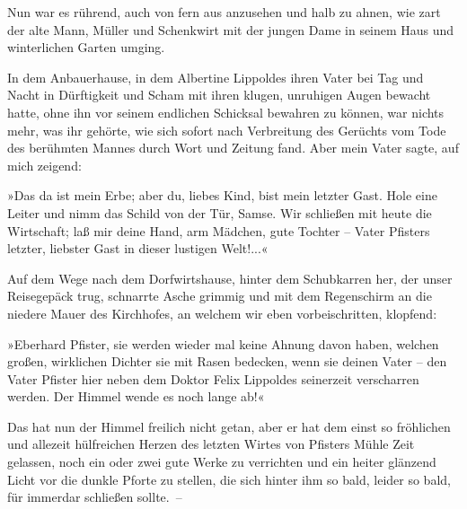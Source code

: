 Nun war es rührend, auch von fern aus anzusehen und halb zu ahnen,
wie zart der alte Mann, Müller und Schenkwirt mit der jungen Dame
in seinem Haus und winterlichen Garten umging.

In dem Anbauerhause, in dem Albertine Lippoldes ihren Vater bei Tag
und Nacht in Dürftigkeit und Scham mit ihren klugen, unruhigen
Augen bewacht hatte, ohne ihn vor seinem endlichen Schicksal
bewahren zu können, war nichts mehr, was ihr gehörte, wie sich
sofort nach Verbreitung des Gerüchts vom Tode des berühmten Mannes
durch Wort und Zeitung fand. Aber mein Vater sagte, auf mich
zeigend:

»Das da ist mein Erbe; aber du, liebes Kind, bist mein letzter
Gast. Hole eine Leiter und nimm das Schild von der Tür, Samse. Wir
schließen mit heute die Wirtschaft; laß mir deine Hand, arm
Mädchen, gute Tochter – Vater Pfisters letzter, liebster Gast in
dieser lustigen Welt!...«

Auf dem Wege nach dem Dorfwirtshause, hinter dem Schubkarren her,
der unser Reisegepäck trug, schnarrte Asche grimmig und mit dem
Regenschirm an die niedere Mauer des Kirchhofes, an welchem wir
eben vorbeischritten, klopfend:

»Eberhard Pfister, sie werden wieder mal keine Ahnung davon haben,
welchen großen, wirklichen Dichter sie mit Rasen bedecken, wenn sie
deinen Vater – den Vater Pfister hier neben dem Doktor Felix
Lippoldes seinerzeit verscharren werden. Der Himmel wende es noch
lange ab!«

Das hat nun der Himmel freilich nicht getan, aber er hat dem einst
so fröhlichen und allezeit hülfreichen Herzen des letzten Wirtes
von Pfisters Mühle Zeit gelassen, noch ein oder zwei gute Werke zu
verrichten und ein heiter glänzend Licht vor die dunkle Pforte zu
stellen, die sich hinter ihm so bald, leider so bald, für immerdar
schließen sollte.~–


